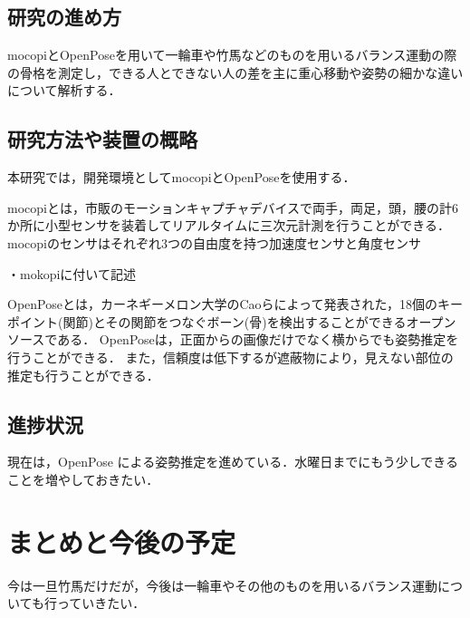 \documentclass[titlepage]{jarticle}
\begin{document}
%
%
\subsection{研究の進め方}
%
mocopiとOpenPoseを用いて一輪車や竹馬などのものを用いるバランス運動の際の骨格を測定し，できる人とできない人の差を主に重心移動や姿勢の細かな違いについて解析する．
%
%
%
\subsection{研究方法や装置の概略}
%
本研究では，開発環境としてmocopiとOpenPoseを使用する．

mocopi\cite{mocopi}とは，市販のモーションキャプチャデバイスで両手，両足，頭，腰の計6か所に小型センサを装着してリアルタイムに三次元計測を行うことができる．
mocopiのセンサはそれぞれ3つの自由度を持つ加速度センサと角度センサ

・mokopiに付いて記述


OpenPose\cite{openpose}とは，カーネギーメロン大学のCaoらによって発表された，18個のキーポイント(関節)とその関節をつなぐボーン(骨)を検出することができるオープンソースである．
OpenPoseは，正面からの画像だけでなく横からでも姿勢推定を行うことができる．
また，信頼度は低下するが遮蔽物により，見えない部位の推定も行うことができる．
%

%
%
%
\subsection{進捗状況}
%
現在は，OpenPose による姿勢推定を進めている．水曜日までにもう少しできることを増やしておきたい．
%
%
%

%

%
%
%
\section{まとめと今後の予定}
今は一旦竹馬だけだが，今後は一輪車やその他のものを用いるバランス運動についても行っていきたい．
%
%

\begin{thebibliography}{99}
  \small{
  }
\end{thebibliography}
\end{document}
